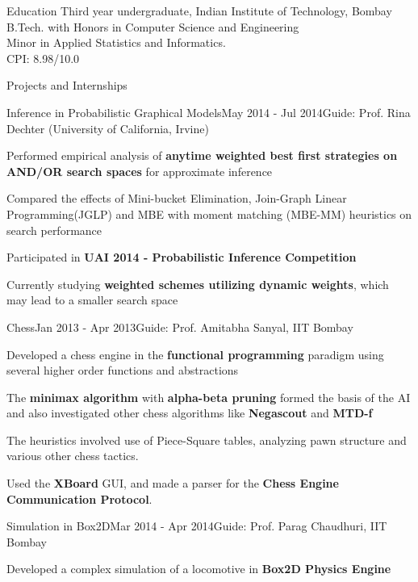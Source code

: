 \documentclass{resume2} %
\begin{document}
\begin{rSection}{Education}
Third year undergraduate, Indian Institute of Technology, Bombay \\B.Tech. with Honors in Computer Science and Engineering \\ Minor in Applied Statistics and Informatics. \\ CPI: 8.98/10.0
\end{rSection}

\begin{rSection}{Projects and Internships}

\begin{rSubsection}{Inference in Probabilistic Graphical Models}{May 2014 - Jul 2014}{Guide: Prof. Rina Dechter (University of California, Irvine)
}{}
\item Performed empirical analysis of \textbf{anytime weighted best first strategies on AND/OR search spaces} for approximate inference
\item Compared the effects of Mini-bucket Elimination, Join-Graph Linear Programming(JGLP) and MBE with moment matching (MBE-MM) heuristics on search performance
\item Participated in \textbf{UAI 2014 - Probabilistic Inference Competition}
\item Currently studying \textbf{weighted schemes utilizing dynamic weights}, which may lead to a smaller search space
\end{rSubsection}

\begin{rSubsection}{Chess}{Jan 2013 - Apr 2013}{Guide: Prof. Amitabha Sanyal, IIT Bombay}{}
\item Developed a chess engine in the \textbf{functional programming} paradigm using several higher order functions and abstractions
\item The \textbf{minimax algorithm} with \textbf{alpha-beta pruning} formed the basis of the AI and also investigated other chess algorithms like \textbf{Negascout} and \textbf{MTD-f} \item The heuristics involved use of Piece-Square tables, analyzing pawn structure and various other chess tactics. 
\item Used the \textbf{XBoard} GUI, and made a parser for the \textbf{Chess Engine Communication Protocol}.
\end{rSubsection}

\begin{rSubsection}{Simulation in Box2D}{Mar 2014 - Apr 2014}{Guide: Prof. Parag Chaudhuri, IIT Bombay}{}
\item Developed a complex simulation of a locomotive in \textbf{Box2D Physics Engine}
\end{rSubsection}


\end{rSection}
\end{document}
